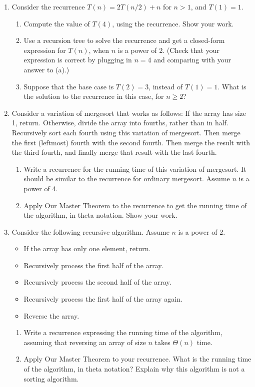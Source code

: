 \documentclass{article}
\begin{document}
\begin{enumerate}
    \item Consider the recurrence $T(n) = 2T(n/2) + n$ for $n > 1$, and $T(1) = 1$.
    \begin{enumerate}
        \item Compute the value of $T(4)$, using the recurrence. Show your work.
        \item Use a recursion tree to solve the recurrence and get a closed-form expression for $T(n)$, when $n$ is a power of 2. (Check that your expression is correct by plugging in $n = 4$ and comparing with your answer to (a).)
        \item Suppose that the base case is $T(2) = 3$, instead of $T(1) = 1$. What is the solution to the recurrence in this case, for $n \ge 2$?
    \end{enumerate}

    \item Consider a variation of mergesort that works as follows: If the array has size 1, return. Otherwise, divide the array into fourths, rather than in half. Recursively sort each fourth using this variation of mergesort. Then merge the first (leftmost) fourth with the second fourth. Then merge the result with the third fourth, and finally merge that result with the last fourth.
    \begin{enumerate}
        \item Write a recurrence for the running time of this variation of mergesort. It should be similar to the recurrence for ordinary mergesort. Assume $n$ is a power of 4.
        \item Apply Our Master Theorem to the recurrence to get the running time of the algorithm, in theta notation. Show your work.
    \end{enumerate}

    \item Consider the following recursive algorithm. Assume $n$ is a power of 2.
    \begin{itemize}
        \item If the array has only one element, return.
        \item Recursively process the first half of the array.
        \item Recursively process the second half of the array.
        \item Recursively process the first half of the array again.
        \item Reverse the array.
    \end{itemize}
    \begin{enumerate}
        \item  Write a recurrence expressing the running time of the algorithm, assuming that reversing an array of size $n$ takes $\Theta(n)$ time.
        \item Apply Our Master Theorem to your recurrence. What is the running time of the algorithm, in theta notation?  Explain why this algorithm is not a sorting algorithm.
    \end{enumerate}



\end{enumerate}
\end{document}
